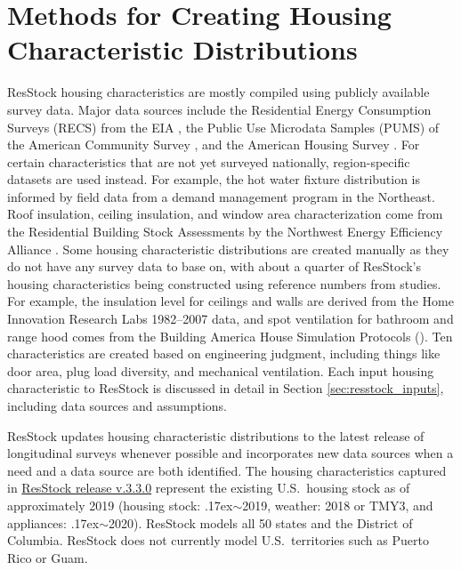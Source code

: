 \section{Methods for Creating Housing Characteristic Distributions}\label{hc_method}
ResStock housing characteristics are mostly compiled using publicly available survey data. Major data sources include the Residential Energy Consumption Surveys (RECS) from the EIA \citep{RECS2020}, the Public Use Microdata Samples (PUMS) of the American Community Survey \citep{PUMS}, and the American Housing Survey \citep{AHS}. For certain characteristics that are not yet surveyed nationally, region-specific datasets are used instead. For example, the hot water fixture distribution is informed by field data from a demand management program in the Northeast. Roof insulation, ceiling insulation, and window area characterization come from the Residential Building Stock Assessments by the Northwest Energy Efficiency Alliance \citep{RBSA}. Some housing characteristic distributions are created manually as they do not have any survey data to base on, with about a quarter of ResStock's housing characteristics being constructed using reference numbers from studies. For example, the insulation level for ceilings and walls are derived from the Home Innovation Research Labs 1982--2007 data, and spot ventilation for bathroom and range hood comes from the Building America House Simulation Protocols (\cite{Wilson2014}). Ten characteristics are created based on engineering judgment, including things like door area, plug load diversity, and mechanical ventilation. Each input housing characteristic to ResStock is discussed in detail in Section \ref{sec:resstock_inputs}, including data sources and assumptions. 

ResStock updates housing characteristic distributions to the latest release of longitudinal surveys whenever possible and incorporates new data sources when a need and a data source are both identified. The housing characteristics captured in \href{https://resstock.readthedocs.io/en/v3.3.0/}{ResStock release v.3.3.0} represent the existing U.S.~housing stock as of approximately 2019 (housing stock: {\raise.17ex\hbox{$\scriptstyle\sim$}}2019, weather: 2018 or TMY3, and appliances: {\raise.17ex\hbox{$\scriptstyle\sim$}}2020). ResStock models all 50 states and the District of Columbia. ResStock does not currently model U.S.~territories such as Puerto Rico or Guam.

